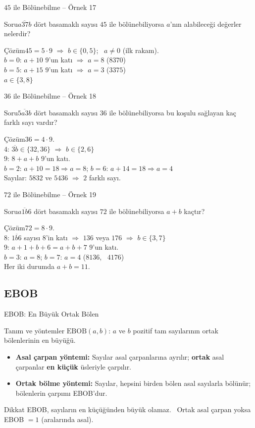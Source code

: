 \documentclass[aspectratio=169,11pt,handout]{beamer}
\newcommand{\soru}[3]{%
\begin{frame}{#1}
  \begin{block}{Soru}\large #2\end{block}
  \pause
  \begin{exampleblock}{Çözüm}\large #3\end{exampleblock}
\end{frame}}
\newcommand{\ab}[1]{\overline{#1}}
\begin{document}
\soru{\(45\) ile Bölünebilme -- Örnek 17}
{\(\ab{a37b}\) dört basamaklı sayısı \(45\) ile bölünebiliyorsa \(a\)'nın alabileceği değerler nelerdir?}
{\(45=5\cdot 9\) \(\Rightarrow\) \(b\in\{0,5\}\); \ \(a\neq 0\) (ilk rakam).\\[3pt]
\(b=0\): \(a+10\) \(9\)'un katı \(\Rightarrow\) \(a=8\) \quad (\(8370\))\\[3pt]
\(b=5\): \(a+15\) \(9\)'un katı \(\Rightarrow\) \(a=3\) \quad (\(3375\))\\[3pt]
\(a\in\{3,8\}\)}

\soru{\(36\) ile Bölünebilme -- Örnek 18}
{\(\ab{5a3b}\) dört basamaklı sayısı \(36\) ile bölünebiliyorsa bu koşulu sağlayan kaç farklı sayı vardır?}
{\(36=4\cdot 9\).\\[3pt]
\(4\): \(\ab{3b}\in\{32,36\}\) \(\Rightarrow\) \(b\in\{2,6\}\)\\[3pt]
\(9\): \(8+a+b\) \(9\)'un katı.\\
\(b=2\): \(a+10=18\Rightarrow a=8\); \quad \(b=6\): \(a+14=18\Rightarrow a=4\)\\[3pt]
Sayılar: \(5832\) ve \(5436\) \(\Rightarrow\) \(2\) farklı sayı.}

\soru{\(72\) ile Bölünebilme -- Örnek 19}
{\(\ab{a1b6}\) dört basamaklı sayısı \(72\) ile bölünebiliyorsa \(a+b\) kaçtır?}
{\(72=8\cdot 9\).\\[3pt]
\(8\): \(\ab{1b6}\) sayısı \(8\)'in katı \(\Rightarrow\) \(136\) veya \(176\) \(\Rightarrow\) \(b\in\{3,7\}\)\\[3pt]
\(9\): \(a+1+b+6=a+b+7\) \(9\)'un katı.\\
\(b=3\): \(a=8\); \quad \(b=7\): \(a=4\) \quad (\(8136\), \ \(4176\))\\[3pt]
Her iki durumda \(a+b=11\).}

\subsection{EBOB}
\begin{frame}{EBOB: En Büyük Ortak Bölen}
\begin{block}{Tanım ve yöntemler}
\(\text{EBOB}(a,b)\): \(a\) ve \(b\) pozitif tam sayılarının ortak bölenlerinin en büyüğü.
\begin{itemize}
\item \textbf{Asal çarpan yöntemi:} Sayılar asal çarpanlarına ayrılır; \textbf{ortak} asal çarpanlar \textbf{en küçük} üsleriyle çarpılır.
\item \textbf{Ortak bölme yöntemi:} Sayılar, hepsini birden bölen asal sayılarla bölünür; bölenlerin çarpımı EBOB'dur.
\end{itemize}
\end{block}
\begin{alertblock}{Dikkat}
EBOB, sayıların en küçüğünden büyük olamaz. \ Ortak asal çarpan yoksa EBOB \(=1\) (aralarında asal).
\end{alertblock}
\end{frame}
\end{document}
